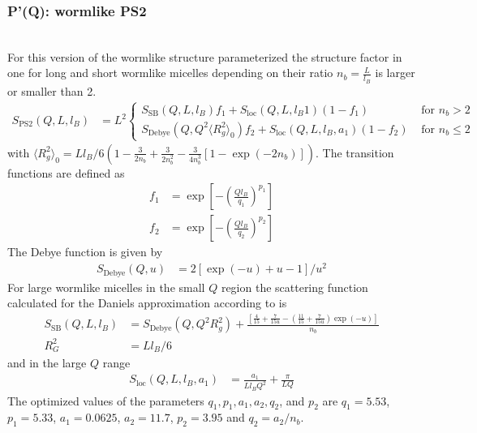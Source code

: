 \subsubsection{P'(Q): wormlike PS2} ~\\
\label{plugin:Pprime4wormPS2}
For this version of the wormlike structure \cite{Pedersen96Macrom} parameterized the structure factor in one for long and short wormlike micelles depending on their ratio $n_b=\frac{L}{l_B}$ is larger or smaller than 2.
\begin{align}
S_\mathrm{PS2}(Q,L,l_B) &= L^2
\begin{cases}
    S_\mathrm{SB}(Q,L,l_B) f_1 + S_\mathrm{loc}(Q,L,l_B1) (1-f_1) & \mbox{ for~}  n_b > 2 \\
    S_\mathrm{Debye}(Q,Q^2\langle R_g^2\rangle_0) f_2 + S_\mathrm{loc}(Q,L,l_B,a_1) (1-f_2) & \mbox{ for~}  n_b \leq 2
\end{cases}
\label{eq:PprimePS2}
\end{align}
with $\langle R_g^2\rangle_0 = Ll_B/6\left(1-\frac{3}{2 n_b}
            +\frac{3}{2 n_b^2}
			-\frac{3}{4 n_b^3}
			\left[1-\exp(-2 n_b)\right]\right)$.
The transition functions are defined as
\begin{align}
f_1 &= \exp\left[-\left(\frac{Ql_B}{q_1}\right)^{p_1}\right] \\
f_2 &= \exp\left[-\left(\frac{Ql_B}{q_2}\right)^{p_2}\right]
\end{align}
The Debye function is given by
\begin{align}
S_\mathrm{Debye}(Q,u) &= 2\left[\exp(-u)+u-1\right]/u^2
\end{align}
For large wormlike micelles in the small $Q$ region the scattering function calculated for the
Daniels approximation \cite{Daniels1952} according to \cite{Sharp1968,Pedersen96Macrom} is
\begin{align}
S_\mathrm{SB}(Q,L,l_B) &= S_\mathrm{Debye}(Q,Q^2 R_g^2)+
    \frac{\left[\frac{4}{15} +\frac{7}{15u}-\left(\frac{11}{15}+\frac{7}{15u}\right)\exp(-u)\right]}{n_b}\\
R_G^2 &=Ll_B/6
\end{align}
and in the large $Q$ range
\begin{align}
S_\mathrm{loc}(Q,L,l_B,a_1) &= \frac{a_1}{Ll_BQ^2} + \frac{\pi}{LQ}
\end{align}
The optimized values of the parameters $q_1,p_1, a_1, a_2, q_2$, and $ p_2$ are
$q_1 = 5.53$, $p_1 = 5.33$, $a_1 = 0.0625$, $a_2 = 11.7$, $p_2 = 3.95$ and
$q_2 = a_2/n_b$.

\vspace{5mm}

